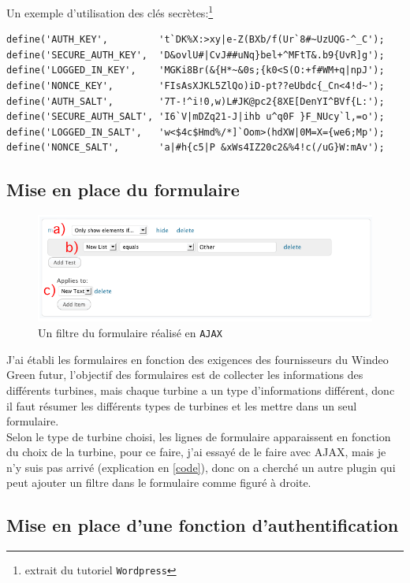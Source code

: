Un exemple d'utilisation des clés secrètes:\footnote{extrait du tutoriel \texttt{Wordpress}}
\begin{verbatim}
define('AUTH_KEY',         't`DK%X:>xy|e-Z(BXb/f(Ur`8#~UzUQG-^_C');
define('SECURE_AUTH_KEY',  'D&ovlU#|CvJ##uNq}bel+^MFtT&.b9{UvR]g');
define('LOGGED_IN_KEY',    'MGKi8Br(&{H*~&0s;{k0<S(O:+f#WM+q|npJ');
define('NONCE_KEY',        'FIsAsXJKL5ZlQo)iD-pt??eUbdc{_Cn<4!d~');
define('AUTH_SALT',        '7T-!^i!0,w)L#JK@pc2{8XE[DenYI^BVf{L:');
define('SECURE_AUTH_SALT', 'I6`V|mDZq21-J|ihb u^q0F }F_NUcy`l,=o');
define('LOGGED_IN_SALT',   'w<$4c$Hmd%/*]`Oom>(hdXW|0M=X={we6;Mp');
define('NONCE_SALT',       'a|#h{c5|P &xWs4IZ20c2&%4!c(/uG}W:mAv');
\end{verbatim}



  \subsection{Mise en place du formulaire}

\begin{figure}
\centering
\includegraphics[scale=0.3]{images/form}
\caption{Un filtre du formulaire réalisé en \texttt{AJAX}}
\end{figure}

J'ai établi les formulaires en fonction des exigences des fournisseurs du Windeo Green futur, 
l’objectif des formulaires est de collecter les informations des différents turbines, mais chaque 
turbine a un type d'informations différent, donc il faut résumer les différents types de turbines 
et les mettre dans un seul formulaire.\\

Selon le type de turbine choisi, les lignes de formulaire apparaissent en fonction du choix de la turbine, pour ce faire, j'ai essayé de le faire avec AJAX, 
mais je n'y suis pas arrivé (explication en \ref{code}), donc on a cherché un autre plugin qui peut ajouter un filtre dans le formulaire comme figuré à droite. 

  \subsection{Mise en place d'une fonction d'authentification}


